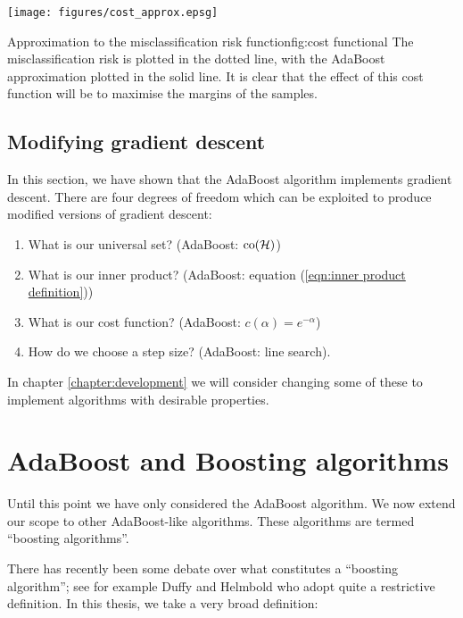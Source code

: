 \begin{linefigure}
\begin{center}
\texttt{[image: figures/cost\_approx.epsg]}
\end{center}
\begin{capt}{Approximation to the misclassification risk
function}{fig:cost functional}
The misclassification risk is plotted in the dotted line, with the
AdaBoost approximation plotted in the solid line.  It is clear that
the effect of this cost function will be to maximise the margins of
the samples.
\end{capt}
\end{linefigure}

\subsection{Modifying gradient descent}

In this section, we have shown that the AdaBoost algorithm implements
gradient descent.  There are four degrees of freedom which can be
exploited to produce modified versions of gradient descent:
%
\begin{enumerate}
\item	What is our universal set? (AdaBoost: $\mathrm{co}(\mathcal{H})$)
\item	What is our inner product? (AdaBoost: equation (\ref{eqn:inner
	product definition}))
\item	What is our cost function? (AdaBoost: $c(\alpha) =
	e^{-\alpha}$)
\item	How do we choose a step size? (AdaBoost: line search).
\end{enumerate}
%
In chapter \ref{chapter:development} we will consider changing some of
these to implement algorithms with desirable properties.


\section{AdaBoost and Boosting algorithms}

Until this point we have only considered the AdaBoost algorithm.  We
now extend our scope to other AdaBoost-like algorithms.  These
algorithms are termed ``boosting algorithms''.

There has recently been some debate over what constitutes a ``boosting
algorithm''; see for example Duffy and Helmbold \cite{Duffy99} who
adopt quite a restrictive definition.  In this thesis, we take a very
broad definition:

